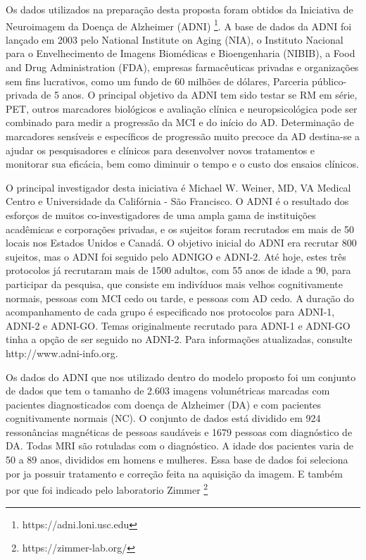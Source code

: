 \documentclass[openright]{UFRGS} %
\begin{document}
Os dados utilizados na preparação desta proposta foram obtidos da Iniciativa de Neuroimagem da Doença de Alzheimer (ADNI) \footnote{https://adni.loni.usc.edu}. A base de dados da ADNI
foi lançado em 2003 pelo National Institute on Aging (NIA), o Instituto Nacional para o Envelhecimento
de Imagens Biomédicas e Bioengenharia (NIBIB), a Food and Drug Administration
(FDA), empresas farmacêuticas privadas e organizações sem fins lucrativos, como um fundo de 60 milhões de dólares,
Parceria público-privada de 5 anos. O principal objetivo da ADNI tem sido testar se
RM em série, PET, outros marcadores biológicos e avaliação clínica e neuropsicológica
pode ser combinado para medir a progressão da MCI e do início do AD. Determinação de
marcadores sensíveis e específicos de progressão muito precoce da AD destina-se a ajudar os pesquisadores
e clínicos para desenvolver novos tratamentos e monitorar sua eficácia, bem como diminuir
o tempo e o custo dos ensaios clínicos.

O principal investigador desta iniciativa é Michael W. Weiner, MD, VA Medical
Centro e Universidade da Califórnia - São Francisco. O ADNI é o resultado dos esforços de muitos
co-investigadores de uma ampla gama de instituições acadêmicas e corporações privadas,
e os sujeitos foram recrutados em mais de 50 locais nos Estados Unidos e Canadá. O objetivo inicial do ADNI era recrutar 800 sujeitos, mas o ADNI foi seguido pelo ADNIGO e ADNI-2.
 Até hoje, estes três protocolos já recrutaram mais de 1500 adultos, com 55 anos de idade
a 90, para participar da pesquisa, que consiste em indivíduos mais velhos cognitivamente normais,
pessoas com MCI cedo ou tarde, e pessoas com AD cedo. A duração do acompanhamento de
cada grupo é especificado nos protocolos para ADNI-1, ADNI-2 e ADNI-GO. Temas
originalmente recrutado para ADNI-1 e ADNI-GO tinha a opção de ser seguido no ADNI-2.
Para informações atualizadas, consulte http://www.adni-info.org.

Os dados do ADNI que nos utilizado dentro do modelo proposto foi
um conjunto de dados que tem o tamanho de 2.603 imagens volumétricas marcadas com pacientes diagnosticados com doença de Alzheimer (DA) e com pacientes cognitivamente normais (NC). O conjunto de dados está dividido em 924 ressonâncias magnéticas de pessoas saudáveis e 1679 pessoas com diagnóstico de DA. Todas MRI são rotuladas com o diagnóstico. A idade dos pacientes varia de 50 a 89 anos, divididos em homens e mulheres. Essa base de dados foi seleciona por ja possuir tratamento e correção  feita na aquisição da imagem. E também por que foi indicado pelo 
laboratorio  Zimmer \footnote[1]{https://zimmer-lab.org/} 
\end{document}
